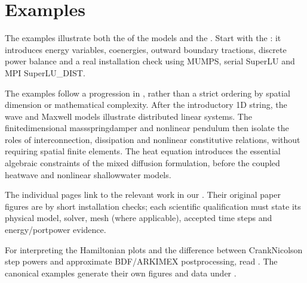 \documentclass[letterpaper,10pt,english]{sphinxmanual}
\begin{document}
\sphinxstepscope


\section{Examples}
\label{\detokenize{examples:examples}}\label{\detokenize{examples::doc}}\label{\detokenize{examples:id1}}
\sphinxAtStartPar
The examples illustrate both the  of the
models and the . Start with the
{\hyperref[\detokenize{started::doc}]{}}: it
introduces energy variables, co\sphinxhyphen{}energies, outward boundary
tractions, discrete power balance and a real installation check
using MUMPS, serial SuperLU and MPI SuperLU\_DIST.

\sphinxAtStartPar
The examples follow a progression in ,
rather than a strict ordering by spatial dimension or mathematical
complexity. After the introductory 1D string, the wave and Maxwell
models illustrate distributed linear systems. The finite\sphinxhyphen{}dimensional
mass\textendash{}spring\textendash{}damper and nonlinear pendulum then isolate the roles of
interconnection, dissipation and nonlinear constitutive relations,
without requiring spatial finite elements. The heat equation introduces
the essential algebraic constraints of the mixed diffusion formulation,
before the coupled heat\textendash{}wave and nonlinear shallow\sphinxhyphen{}water models.

\sphinxAtStartPar
The individual pages link to the relevant work in our
{\hyperref[\detokenize{biblio::doc}]{}}. Their original paper figures are
 by short installation checks;
each scientific qualification must state its physical model,
solver, mesh (where applicable), accepted time steps and
energy/port\sphinxhyphen{}power evidence.

\sphinxAtStartPar
For interpreting the Hamiltonian plots and the difference between
Crank\textendash{}Nicolson step powers and approximate BDF/ARKIMEX
post\sphinxhyphen{}processing, read {\hyperref[\detokenize{energy_and_power::doc}]{}}. The canonical
examples generate their own figures and data under
.
\end{document}
